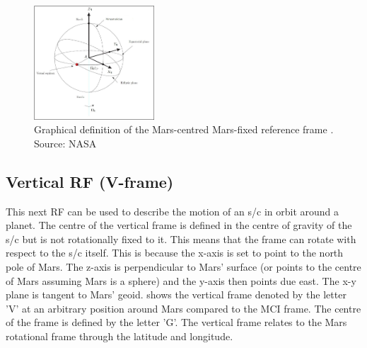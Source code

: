 
\begin{figure}[!ht]
\centering
\includegraphics[width=0.4\textwidth]{figures/reference_frames/ecef_mooij2013fd.jpg}
\caption{Graphical definition of the Mars-centred Mars-fixed reference frame \cite{mooij2013fd}. Source: NASA}
\label{fig:ecef_mooij2013fd}
\end{figure}




\subsection{Vertical \ac{RF} (V-frame)}
\label{subsec:VCNE}
This next \ac{RF} can be used to describe the motion of an \ac{s/c} in orbit around a planet. The centre of the vertical frame is defined in the centre of gravity of the \ac{s/c} \cite{mooij2013fd} but is not rotationally fixed to it. This means that the frame can rotate with respect to the \ac{s/c} itself. This is because the x-axis is set to point to the north pole of Mars. The z-axis is perpendicular to Mars' surface (or points to the centre of Mars assuming Mars is a sphere) and the y-axis then points due east. The x-y plane is tangent to Mars' geoid.  shows the vertical frame denoted by the letter 'V' at an arbitrary position around Mars compared to the \ac{MCI} frame. The centre of the frame is defined by the letter 'G'. The vertical frame relates to the Mars rotational frame through the latitude and longitude. 

